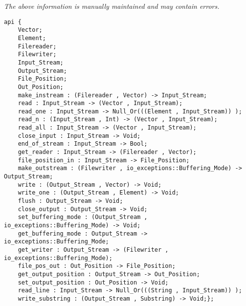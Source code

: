 \label{api:Winix\_Pure\_Text\_File\_For\_Os\_\_Premicrothread}

{\tiny \it The above information is manually maintained and may contain errors.}
\begin{verbatim}
api {
    Vector;
    Element;
    Filereader;
    Filewriter;
    Input_Stream;
    Output_Stream;
    File_Position;
    Out_Position;
    make_instream : (Filereader , Vector) -> Input_Stream;
    read : Input_Stream -> (Vector , Input_Stream);
    read_one : Input_Stream -> Null_Or(((Element , Input_Stream)) );
    read_n : (Input_Stream , Int) -> (Vector , Input_Stream);
    read_all : Input_Stream -> (Vector , Input_Stream);
    close_input : Input_Stream -> Void;
    end_of_stream : Input_Stream -> Bool;
    get_reader : Input_Stream -> (Filereader , Vector);
    file_position_in : Input_Stream -> File_Position;
    make_outstream : (Filewriter , io_exceptions::Buffering_Mode) -> Output_Stream;
    write : (Output_Stream , Vector) -> Void;
    write_one : (Output_Stream , Element) -> Void;
    flush : Output_Stream -> Void;
    close_output : Output_Stream -> Void;
    set_buffering_mode : (Output_Stream , io_exceptions::Buffering_Mode) -> Void;
    get_buffering_mode : Output_Stream -> io_exceptions::Buffering_Mode;
    get_writer : Output_Stream -> (Filewriter , io_exceptions::Buffering_Mode);
    file_pos_out : Out_Position -> File_Position;
    get_output_position : Output_Stream -> Out_Position;
    set_output_position : Out_Position -> Void;
    read_line : Input_Stream -> Null_Or(((String , Input_Stream)) );
    write_substring : (Output_Stream , Substring) -> Void;};
\end{verbatim}
